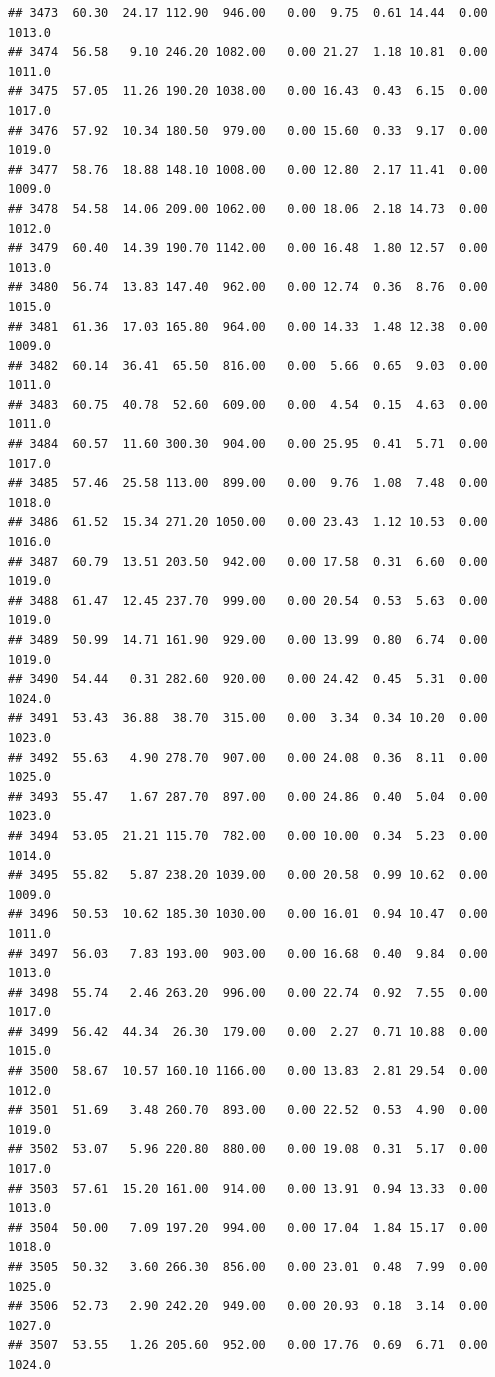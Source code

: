 \documentclass{article}\usepackage{graphicx, color}
\makeatletter
\newenvironment{kframe}{%
 \def\at@end@of@kframe{}%
 \ifinner\ifhmode%
  \def\at@end@of@kframe{\end{minipage}}%
  \begin{minipage}{\columnwidth}%
 \fi\fi%
 \def\FrameCommand##1{\hskip\@totalleftmargin \hskip-\fboxsep
 \colorbox{shadecolor}{##1}\hskip-\fboxsep
     \hskip-\linewidth \hskip-\@totalleftmargin \hskip\columnwidth}%
 \MakeFramed {\advance\hsize-\width
   \@totalleftmargin\z@ \linewidth\hsize
   \@setminipage}}%
 {\par\unskip\endMakeFramed%
 \at@end@of@kframe}
\newenvironment{knitrout}{}{} %
\makeatother
\begin{document}
\begin{knitrout}
\begin{kframe}
\begin{verbatim}
## 3473  60.30  24.17 112.90  946.00   0.00  9.75  0.61 14.44  0.00 1013.0
## 3474  56.58   9.10 246.20 1082.00   0.00 21.27  1.18 10.81  0.00 1011.0
## 3475  57.05  11.26 190.20 1038.00   0.00 16.43  0.43  6.15  0.00 1017.0
## 3476  57.92  10.34 180.50  979.00   0.00 15.60  0.33  9.17  0.00 1019.0
## 3477  58.76  18.88 148.10 1008.00   0.00 12.80  2.17 11.41  0.00 1009.0
## 3478  54.58  14.06 209.00 1062.00   0.00 18.06  2.18 14.73  0.00 1012.0
## 3479  60.40  14.39 190.70 1142.00   0.00 16.48  1.80 12.57  0.00 1013.0
## 3480  56.74  13.83 147.40  962.00   0.00 12.74  0.36  8.76  0.00 1015.0
## 3481  61.36  17.03 165.80  964.00   0.00 14.33  1.48 12.38  0.00 1009.0
## 3482  60.14  36.41  65.50  816.00   0.00  5.66  0.65  9.03  0.00 1011.0
## 3483  60.75  40.78  52.60  609.00   0.00  4.54  0.15  4.63  0.00 1011.0
## 3484  60.57  11.60 300.30  904.00   0.00 25.95  0.41  5.71  0.00 1017.0
## 3485  57.46  25.58 113.00  899.00   0.00  9.76  1.08  7.48  0.00 1018.0
## 3486  61.52  15.34 271.20 1050.00   0.00 23.43  1.12 10.53  0.00 1016.0
## 3487  60.79  13.51 203.50  942.00   0.00 17.58  0.31  6.60  0.00 1019.0
## 3488  61.47  12.45 237.70  999.00   0.00 20.54  0.53  5.63  0.00 1019.0
## 3489  50.99  14.71 161.90  929.00   0.00 13.99  0.80  6.74  0.00 1019.0
## 3490  54.44   0.31 282.60  920.00   0.00 24.42  0.45  5.31  0.00 1024.0
## 3491  53.43  36.88  38.70  315.00   0.00  3.34  0.34 10.20  0.00 1023.0
## 3492  55.63   4.90 278.70  907.00   0.00 24.08  0.36  8.11  0.00 1025.0
## 3493  55.47   1.67 287.70  897.00   0.00 24.86  0.40  5.04  0.00 1023.0
## 3494  53.05  21.21 115.70  782.00   0.00 10.00  0.34  5.23  0.00 1014.0
## 3495  55.82   5.87 238.20 1039.00   0.00 20.58  0.99 10.62  0.00 1009.0
## 3496  50.53  10.62 185.30 1030.00   0.00 16.01  0.94 10.47  0.00 1011.0
## 3497  56.03   7.83 193.00  903.00   0.00 16.68  0.40  9.84  0.00 1013.0
## 3498  55.74   2.46 263.20  996.00   0.00 22.74  0.92  7.55  0.00 1017.0
## 3499  56.42  44.34  26.30  179.00   0.00  2.27  0.71 10.88  0.00 1015.0
## 3500  58.67  10.57 160.10 1166.00   0.00 13.83  2.81 29.54  0.00 1012.0
## 3501  51.69   3.48 260.70  893.00   0.00 22.52  0.53  4.90  0.00 1019.0
## 3502  53.07   5.96 220.80  880.00   0.00 19.08  0.31  5.17  0.00 1017.0
## 3503  57.61  15.20 161.00  914.00   0.00 13.91  0.94 13.33  0.00 1013.0
## 3504  50.00   7.09 197.20  994.00   0.00 17.04  1.84 15.17  0.00 1018.0
## 3505  50.32   3.60 266.30  856.00   0.00 23.01  0.48  7.99  0.00 1025.0
## 3506  52.73   2.90 242.20  949.00   0.00 20.93  0.18  3.14  0.00 1027.0
## 3507  53.55   1.26 205.60  952.00   0.00 17.76  0.69  6.71  0.00 1024.0

\end{verbatim}
\end{kframe}
\end{knitrout}
\end{document}
